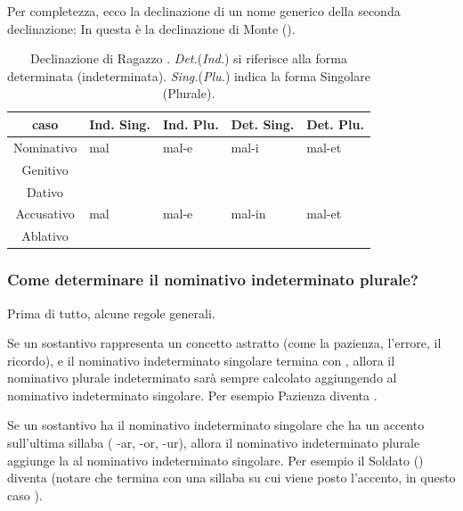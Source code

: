Per completezza, ecco la declinazione di un nome generico della seconda declinazione: In  questa è la declinazione di Monte ().

\begin{table}[H]
    \centering
    \begin{tabular}{cll|ll}
        \toprule
        caso        & Ind. Sing.    & Ind. Plu. & Det. Sing.    & Det. Plu. \\
        \midrule
        Nominativo  & mal         & mal-e     & mal-i          & mal-et \\
        Genitivo    &          &     &         & \\
        Dativo      &          &     &         & \\
        Accusativo  & mal         & mal-e    & mal-in        & mal-et\\
        Ablativo    &          &     &         & \\
        \bottomrule
    \end{tabular}
    \caption{Declinazione di Ragazzo . \textit{Det.}(\textit{Ind.}) si riferisce alla forma determinata (indeterminata). \textit{Sing.}(\textit{Plu.}) indica la forma Singolare (Plurale)\cite{vocedellaquila:accusativo}.}
    \label{tbl:mal}
\end{table}


\subsubsection{Come determinare il nominativo indeterminato plurale?}

Prima di tutto, alcune regole generali.

Se un sostantivo rappresenta un concetto astratto (come la pazienza, l'errore, il ricordo), e il nominativo indeterminato singolare termina con , allora il nominativo plurale indeterminato sarà sempre calcolato aggiungendo  al nominativo indeterminato singolare. Per esempio Pazienza  diventa .

Se un sostantivo ha il nominativo indeterminato singolare che ha un accento sull'ultima sillaba (\eg{} -ar, -or, -ur), allora il nominativo indeterminato plurale aggiunge la  al nominativo indeterminato singolare. Per esempio il Soldato () diventa (notare che  termina con una sillaba su cui viene posto l'accento, in questo caso ).

